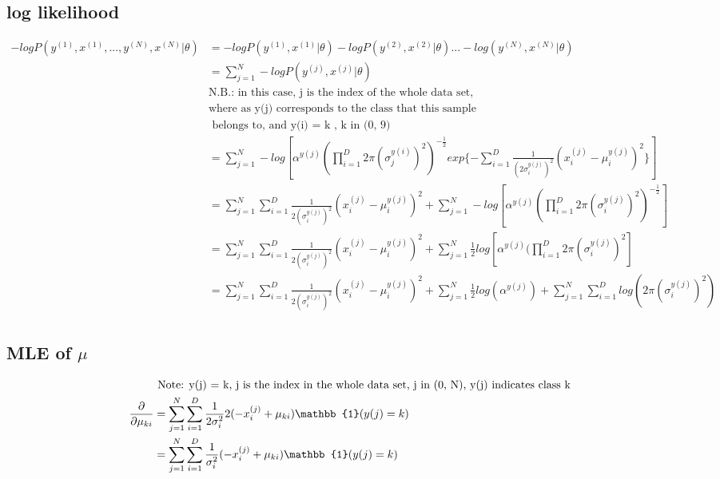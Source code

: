 \documentclass[letterpaper, 12]{article}
\begin{document}
\subsection{log likelihood}
\begin{equation*}
\begin{split}
-log P(y^{(1)}, x^{(1)}, ..., y^{(N)}, x^{(N)} | \theta) 
&=-log P(y^{(1)}, x^{(1)} | \theta) -log P(y^{(2)}, x^{(2)} | \theta) ... - log( y^{(N)}, x^{(N)} | \theta)\\
&= \sum_{j=1}^{N} -log P(y^{(j)}, x^{(j)} | \theta)\\
&\text{N.B.: in this case, j is the index of the whole data set,} \\
&\text{where as y(j) corresponds to the class that this sample}\\
&\text{ belongs to, and y(i) = k , k in (0, 9)}\\
&= \sum_{j = 1}^{N} -log [\alpha^{y{(j)}} (\prod_{i = 1}^{D} 2 \pi (\sigma_{j} ^{y(i)}) ^2)^{ -\frac{1}{2}}
	 exp\{ - \sum_{i = 1}^{D} \frac{1}{(2 \sigma_{i}^{y(j)}) ^2} (x_{i}^{(j)} - \mu_{i}^{y(j)})^2  \}] \\
&= \sum_{j=1}^{N} \sum_{i = 1}^{D} \frac{1}{2 (\sigma_{i}^{y(j)}) ^2}(x_{i}^{(j)} - \mu_{i}^{y(j)})^2 
	+ \sum_{j = 1}^{N} -log [\alpha^{y(j)} (\prod_{i = 1}^{D} 2 \pi (\sigma_{i}^{y(j)}) ^2)^{ -\frac{1}{2}}]\\
&=  \sum_{j = 1}^{N} \sum_{i = 1}^{D} \frac{1}{2(\sigma_{i}^{y(j)})^2}(x_{i}^{(j)} - \mu_{i}^{y(j)})^2 
	+ \sum_{j = 1}^{N} \frac{1}{2} log [\alpha^{y(j)} (\prod_{i = 1}^{D} 2 \pi (\sigma_{i}^{y(j)}) ^2]\\
&= \sum_{j = 1}^{N} \sum_{i = 1}^{D} \frac{1}{2 (\sigma_{i}^{y(j)}) ^2}(x_{i}^{(j)} - \mu_{i}^{y(j)})^2  + 
	\sum_{j=1}^{N} \frac{1}{2} log( \alpha^{y(j)}) + \sum_{j = 1}^{N} \sum_{i = 1}^{D} log(2 \pi (\sigma_{i}^{y(j)})^2)  \\
\end{split}
\end{equation*}


\subsection{MLE of $\mu$}

\begin{equation*}
\begin{split}
&\text{	Note: y(j) = k, j is the index in the whole data set, j in (0, N), y(j) indicates class k}\\
\pdv{}{\mu_{ki}} &= \sum_{j = 1}^{N} \sum_{i = 1}^{D} \frac{1}{2 \sigma_{i} ^2}
		2(- x_{i}^{(j)} + \mu_{ki})  \mathbb{1} ( y(j) = k) \\
&=\sum_{j = 1}^{N}  \sum_{i = 1}^{D} \frac{1}{\sigma_{i} ^2}
		(- x_{i}^{(j)} + \mu_{ki})  \mathbb{1} ( y(j) = k) \\
\end{split}
\end{equation*}
\end{document}
